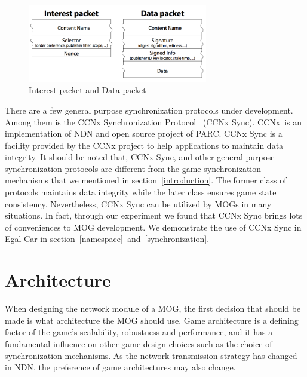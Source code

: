 \documentclass{article}
\begin{document}
\begin{figure}
\begin{center}
\includegraphics[width=0.7\textwidth] {image/packet_types}
\caption{Interest packet and Data packet}
\label{img:packet_types}
\end{center}
\end{figure}

There are a few general purpose synchronization protocols under development. Among them is the CCNx Synchronization Protocol~\cite{CCNxSync} (CCNx Sync). CCNx\textregistered~is an implementation of NDN and open source project of PARC\textregistered. CCNx Sync is a facility provided by the CCNx project to help applications to maintain data integrity. It should be noted that, CCNx Sync, and other general purpose synchronization protocols are different from the game synchronization mechanisms that we mentioned in section~\ref{introduction}. The former class of protocols maintains data integrity while the later class ensures game state consistency. Nevertheless, CCNx Sync can be utilized by MOGs in many situations. In fact, through our experiment we found that CCNx Sync brings lots of conveniences to MOG development. We demonstrate the use of CCNx Sync in Egal Car in section~\ref{namespace}~and~\ref{synchronization}.


\section{Architecture}
\label{architecture}

When designing the network module of a MOG, the first decision that should be made is what architecture the MOG should use. Game architecture is a defining factor of the game's scalability, robustness and performance, and it has a fundamental influence on other game design choices such as the choice of synchronization mechanisms. As the network transmission strategy has changed in NDN, the preference of game architectures may also change.
\end{document}
